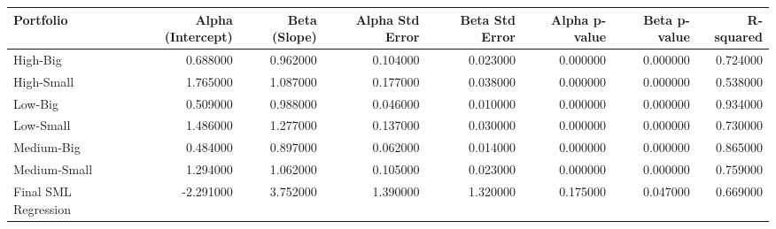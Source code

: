 \begin{tabular}{lrrrrrrr}
\toprule
Portfolio & Alpha (Intercept) & Beta (Slope) & Alpha Std Error & Beta Std Error & Alpha p-value & Beta p-value & R-squared \\
\midrule
High-Big & 0.688000 & 0.962000 & 0.104000 & 0.023000 & 0.000000 & 0.000000 & 0.724000 \\
High-Small & 1.765000 & 1.087000 & 0.177000 & 0.038000 & 0.000000 & 0.000000 & 0.538000 \\
Low-Big & 0.509000 & 0.988000 & 0.046000 & 0.010000 & 0.000000 & 0.000000 & 0.934000 \\
Low-Small & 1.486000 & 1.277000 & 0.137000 & 0.030000 & 0.000000 & 0.000000 & 0.730000 \\
Medium-Big & 0.484000 & 0.897000 & 0.062000 & 0.014000 & 0.000000 & 0.000000 & 0.865000 \\
Medium-Small & 1.294000 & 1.062000 & 0.105000 & 0.023000 & 0.000000 & 0.000000 & 0.759000 \\
Final SML Regression & -2.291000 & 3.752000 & 1.390000 & 1.320000 & 0.175000 & 0.047000 & 0.669000 \\
\bottomrule
\end{tabular}
